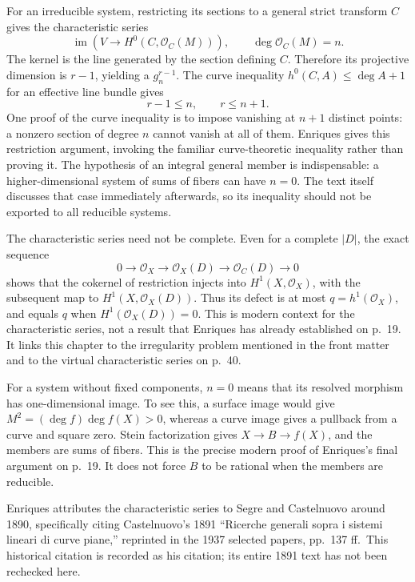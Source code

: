 For an irreducible system, restricting its sections to a general strict transform \(C\) gives the characteristic series \[
\operatorname{im}\!\left(V\longrightarrow H^0(C,\mathcal O_C(M))\right),
\qquad \deg\mathcal O_C(M)=n.
\] The kernel is the line generated by the section defining \(C\). Therefore its projective dimension is \(r-1\), yielding a \(g_n^{r-1}\). The curve inequality \(h^0(C,A)\le \deg A+1\) for an effective line bundle gives \[
r-1\le n,\qquad r\le n+1.
\] One proof of the curve inequality is to impose vanishing at \(n+1\) distinct points: a nonzero section of degree \(n\) cannot vanish at all of them. Enriques gives this restriction argument, invoking the familiar curve-theoretic inequality rather than proving it. The hypothesis of an integral general member is indispensable: a higher-dimensional system of sums of fibers can have \(n=0\). The text itself discusses that case immediately afterwards, so its inequality should not be exported to all reducible systems.

The characteristic series need not be complete. Even for a complete \(|D|\), the exact sequence \[
0\longrightarrow\mathcal O_X
\longrightarrow\mathcal O_X(D)
\longrightarrow\mathcal O_C(D)
\longrightarrow0
\] shows that the cokernel of restriction injects into \(H^1(X,\mathcal O_X)\), with the subsequent map to \(H^1(X,\mathcal O_X(D))\). Thus its defect is at most \(q=h^1(\mathcal O_X)\), and equals \(q\) when \(H^1(\mathcal O_X(D))=0\). This is modern context for the characteristic series, not a result that Enriques has already established on p.~19. It links this chapter to the irregularity problem mentioned in the front matter and to the virtual characteristic series on p.~40.

For a system without fixed components, \(n=0\) means that its resolved morphism has one-dimensional image. To see this, a surface image would give \(M^2=(\deg f)\deg f(X)>0\), whereas a curve image gives a pullback from a curve and square zero. Stein factorization gives \(X\to B\to f(X)\), and the members are sums of fibers. This is the precise modern proof of Enriques's final argument on p.~19. It does not force \(B\) to be rational when the members are reducible.

Enriques attributes the characteristic series to Segre and Castelnuovo around 1890, specifically citing Castelnuovo's 1891 ``Ricerche generali sopra i sistemi lineari di curve piane,'' reprinted in the 1937 selected papers, pp.~137 ff.~This historical citation is recorded as his citation; its entire 1891 text has not been rechecked here.

